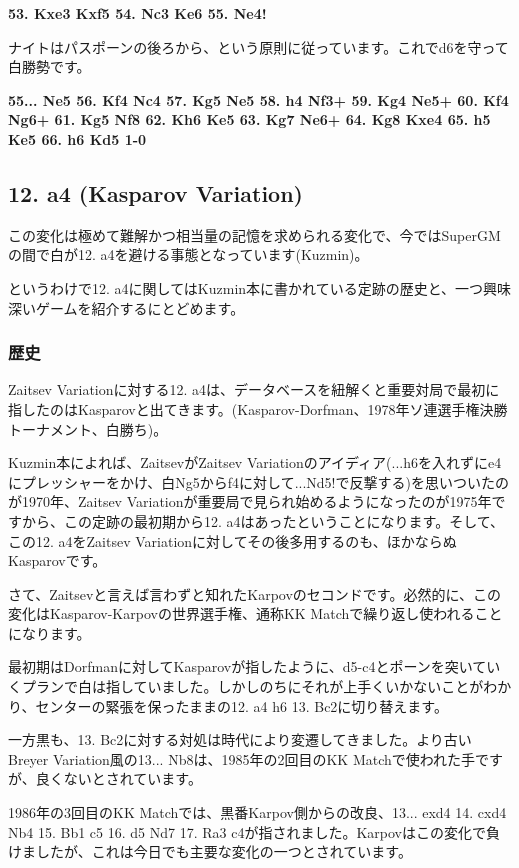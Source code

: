 {\bf 53. Kxe3 Kxf5 54. Nc3 Ke6 55. Ne4!}

ナイトはパスポーンの後ろから、という原則に従っています。これでd6を守って白勝勢です。

{\bf 55... Ne5 56. Kf4 Nc4 57. Kg5 Ne5 58. h4 Nf3+ 59. Kg4 Ne5+ 60. Kf4 Ng6+ 61. Kg5 Nf8 62. Kh6 Ke5 63. Kg7 Ne6+ 64. Kg8 Kxe4 65. h5 Ke5 66. h6 Kd5 1-0}


\subsection{12. a4 (Kasparov Variation)}
この変化は極めて難解かつ相当量の記憶を求められる変化で、今ではSuperGMの間で白が12. a4を避ける事態となっています(Kuzmin)。

というわけで12. a4に関してはKuzmin本に書かれている定跡の歴史と、一つ興味深いゲームを紹介するにとどめます。

\subsubsection{歴史}
Zaitsev Variationに対する12. a4は、データベースを紐解くと重要対局で最初に指したのはKasparovと出てきます。(Kasparov-Dorfman、1978年ソ連選手権決勝トーナメント、白勝ち)。

Kuzmin本によれば、ZaitsevがZaitsev Variationのアイディア(...h6を入れずにe4にプレッシャーをかけ、白Ng5からf4に対して...Nd5!で反撃する)を思いついたのが1970年、Zaitsev Variationが重要局で見られ始めるようになったのが1975年ですから、この定跡の最初期から12. a4はあったということになります。そして、この12. a4をZaitsev Variationに対してその後多用するのも、ほかならぬKasparovです。

さて、Zaitsevと言えば言わずと知れたKarpovのセコンドです。必然的に、この変化はKasparov-Karpovの世界選手権、通称KK Matchで繰り返し使われることになります。

最初期はDorfmanに対してKasparovが指したように、d5-c4とポーンを突いていくプランで白は指していました。しかしのちにそれが上手くいかないことがわかり、センターの緊張を保ったままの12. a4 h6 13. Bc2に切り替えます。

一方黒も、13. Bc2に対する対処は時代により変遷してきました。より古いBreyer Variation風の13... Nb8は、1985年の2回目のKK Matchで使われた手ですが、良くないとされています。

1986年の3回目のKK Matchでは、黒番Karpov側からの改良、13... exd4 14. cxd4 Nb4 15. Bb1 c5 16. d5 Nd7 17. Ra3 c4が指されました。Karpovはこの変化で負けましたが、これは今日でも主要な変化の一つとされています。

